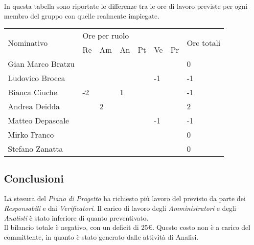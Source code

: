 \begin{flushleft}
    In questa tabella  sono riportate le differenze tra le ore di lavoro previste per ogni membro del gruppo con quelle realmente impiegate.\\
    \begin{table}[h]
        \begin{tabular}{|l|l|l|l|l|l|l|l|}
        \hline
        \multirow{2}{*}{Nominativo} & \multicolumn{6}{l|}{Ore per ruolo} & \multirow{2}{*}{Ore totali} \\ \cline{2-7}
                                    & Re   & Am  & An  & Pt  & Ve  & Pr  &                             \\ \hline
        Gian Marco Bratzu           &      &     &     &     &     &     & 0                           \\ \hline
        Ludovico Brocca             &      &     &     &     & -1  &     & -1                          \\ \hline
        Bianca Ciuche               & -2   &     & 1   &     &     &     & -1                          \\ \hline
        Andrea Deidda               &      & 2   &     &     &     &     & 2                           \\ \hline
        Matteo Depascale            &      &     &     &     & -1  &     & -1                          \\ \hline
        Mirko Franco                &      &     &     &     &     &     & 0                           \\ \hline
        Stefano Zanatta             &      &     &     &     &     &     & 0                           \\ \hline
        \end{tabular}
        \end{table}
    \subsection{Conclusioni}
    La stesura del \textit{Piano di Progetto} ha richiesto più lavoro del previsto da parte dei \textit{Responsabili} e dai \textit{Verificatori}. Il carico di lavoro degli \textit{Amministratori} e degli \textit{Analisti} è stato inferiore di quanto preventivato.\\ Il bilancio totale è negativo, con un deficit di 25\euro. Questo costo non è a carico del committente, in quanto è stato generato dalle attività di Analisi.
    \end{flushleft}